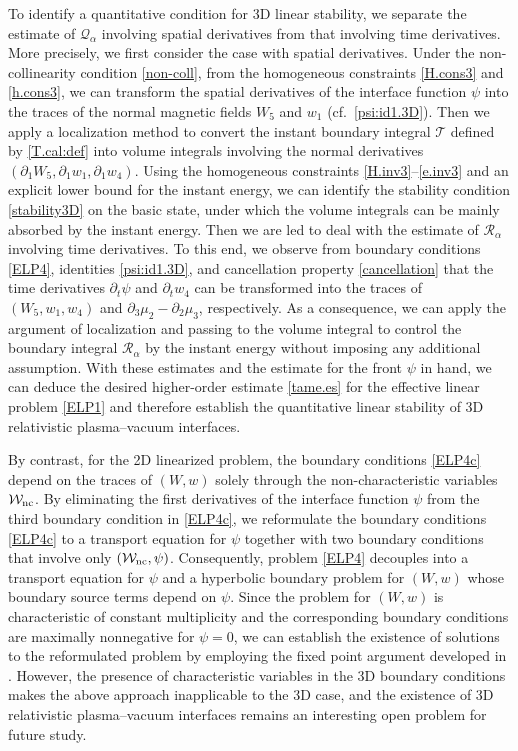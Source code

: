 \documentclass[twoside,11pt]{article}
\numberwithin{equation}{section}
\def\p{\partial}
\begin{document}
To identify a quantitative condition for 3D linear stability, we separate the estimate of $\mathcal{Q}_{\alpha}$ involving spatial derivatives from that involving time derivatives.
More precisely, we first consider the case with spatial derivatives.
Under the non-collinearity condition \eqref{non-coll},
from the homogeneous constraints \eqref{H.cons3} and \eqref{h.cons3}, we can transform the spatial derivatives of the interface function $\psi$ into the traces of the normal magnetic fields $W_5$ and $w_1$ (cf.~\eqref{psi:id1.3D}).
Then we apply a localization method to convert the instant boundary integral $\mathcal{T}$ defined by \eqref{T.cal:def} into volume integrals involving the normal derivatives $( \p_1 W_5, \p_1 w_1, \p_1  w_4)$.
Using the homogeneous constraints \eqref{H.inv3}--\eqref{e.inv3} and an explicit lower bound for the instant energy, we can identify the stability condition \eqref{stability3D} on the basic state, under which the volume integrals can be mainly absorbed by the instant energy.
Then we are led to deal with the estimate of $\mathcal{R}_{\alpha}$ involving time derivatives.
To this end, we observe from boundary conditions \eqref{ELP4}, identities \eqref{psi:id1.3D}, and cancellation property \eqref{cancellation} that the time derivatives $\p_t \psi$ and $\p_t w_4$ can be transformed into the traces of $(W_5, w_1, w_4)$ and $\p_3\mu_2-\p_2\mu_3$, respectively.
As a consequence, we can apply the argument of localization and passing to the volume integral to
control the boundary integral $\mathcal{R}_{\alpha}$ by the instant energy without imposing any additional assumption.
With these estimates and the estimate for the front $\psi$ in hand,
we can deduce the desired higher-order estimate \eqref{tame.es} for the effective linear problem \eqref{ELP1} and therefore establish the quantitative linear stability of 3D relativistic plasma--vacuum interfaces.


 
{By contrast},
for the 2D linearized problem, 
the boundary conditions \eqref{ELP4c} depend on the traces of $(W,w)$ solely through the non-characteristic variables $\mathcal{W}_{\rm nc}$. 
By eliminating the first derivatives of  the interface function $\psi$ from the third boundary condition in \eqref{ELP4c}, we reformulate the boundary conditions \eqref{ELP4c} to a transport equation for $\psi$ together with two boundary conditions that involve only $(\mathcal{W}_{\rm nc},\psi)$.
Consequently, problem \eqref{ELP4} decouples into a transport equation for $\psi$ and a hyperbolic boundary problem for $(W,w)$ whose boundary source terms depend on $\psi$.
Since the problem for $(W,w)$ is characteristic of constant multiplicity and the corresponding boundary conditions are maximally nonnegative for $\psi=0$, we can establish the existence of solutions to the reformulated problem by employing the fixed point argument developed in \cite{ST13MR3148595}.
However, the presence of characteristic variables in the 3D boundary conditions makes the above approach inapplicable to the 3D case, and the existence of 3D relativistic plasma--vacuum interfaces remains an interesting open problem for future study.
\end{document}
